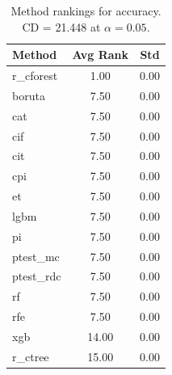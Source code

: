 \begin{table}[h]
\centering
\caption{Method rankings for accuracy. CD = 21.448 at $\alpha=0.05$.}
\label{tab:ranks_accuracy}
\begin{tabular}{lcc}
\toprule
Method & Avg Rank & Std \\
\midrule
r_cforest & 1.00 & 0.00 \\
boruta & 7.50 & 0.00 \\
cat & 7.50 & 0.00 \\
cif & 7.50 & 0.00 \\
cit & 7.50 & 0.00 \\
cpi & 7.50 & 0.00 \\
et & 7.50 & 0.00 \\
lgbm & 7.50 & 0.00 \\
pi & 7.50 & 0.00 \\
ptest_mc & 7.50 & 0.00 \\
ptest_rdc & 7.50 & 0.00 \\
rf & 7.50 & 0.00 \\
rfe & 7.50 & 0.00 \\
xgb & 14.00 & 0.00 \\
r_ctree & 15.00 & 0.00 \\
\bottomrule
\end{tabular}
\end{table}